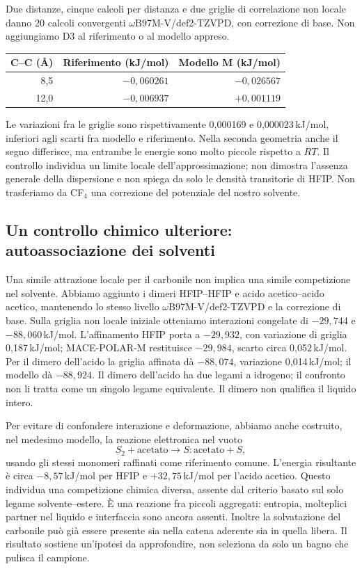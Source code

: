 \documentclass[11pt,reqno]{amsart}
\numberwithin{equation}{section}
\begin{document}
Due distanze, cinque calcoli per distanza e due griglie di
correlazione non locale danno 20 calcoli convergenti
$\omega$B97M-V/def2-TZVPD, con correzione di base. Non
aggiungiamo D3 al riferimento o al modello appreso.
\begin{center}
\begin{tabular}{@{}rrr@{}}
\toprule
C--C (\AA)&Riferimento (kJ/mol)&Modello M (kJ/mol)\\
\midrule
8,5&$-0,060261$&$-0,026567$\\
12,0&$-0,006937$&$+0,001119$\\
\bottomrule
\end{tabular}
\end{center}
Le variazioni fra le griglie sono rispettivamente 0,000169
e 0,000023\,kJ/mol, inferiori agli scarti fra modello e
riferimento. Nella seconda geometria anche il segno differisce,
ma entrambe le energie sono molto piccole rispetto a $RT$.
Il controllo individua un limite locale dell'approssimazione;
non dimostra l'assenza generale della dispersione e non
spiega da solo le densit\`a transitorie di HFIP. Non trasferiamo
da CF$_4$ una correzione del potenziale del nostro solvente.

\subsection{Un controllo chimico ulteriore: autoassociazione dei solventi}

Una simile attrazione locale per il carbonile non implica
una simile competizione nel solvente. Abbiamo aggiunto i
dimeri HFIP--HFIP e acido acetico--acido acetico, mantenendo
lo stesso livello $\omega$B97M-V/def2-TZVPD e la correzione
di base. Sulla griglia non locale iniziale otteniamo interazioni
congelate di $-29{,}744$ e $-88{,}060$\,kJ/mol. L'affinamento
HFIP porta a $-29{,}932$, con variazione di griglia 0,187\,kJ/mol;
MACE-POLAR-M restituisce $-29{,}984$, scarto circa 0,052\,kJ/mol.
Per il dimero dell'acido la griglia affinata d\`a $-88{,}074$,
variazione 0,014\,kJ/mol; il modello d\`a $-88{,}924$. Il dimero dell'acido
ha due legami a idrogeno; il confronto non li tratta come un
singolo legame equivalente. Il dimero non qualifica il liquido intero.

Per evitare di confondere interazione e deformazione,
abbiamo anche costruito, nel medesimo modello, la reazione
elettronica nel vuoto
\begin{equation}
 S_2+\mathrm{acetato}\longrightarrow S\!:\!\mathrm{acetato}+S,
\end{equation}
usando gli stessi monomeri raffinati come riferimento comune.
L'energia risultante \`e circa $-8,57$\,kJ/mol per HFIP e
$+32,75$\,kJ/mol per l'acido acetico. Questo individua una
competizione chimica diversa, assente dal criterio basato sul
solo legame solvente--estere. \`E una reazione fra piccoli
aggregati: entropia, molteplici partner nel liquido e interfaccia
sono ancora assenti. Inoltre la solvatazione del carbonile
pu\`o gi\`a essere presente sia nella catena aderente sia in
quella libera. Il risultato sostiene un'ipotesi da approfondire,
non seleziona da solo un bagno che pulisca il campione.
\end{document}
